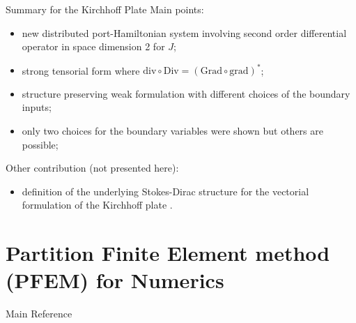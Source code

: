 \documentclass{beamer}
\begin{document}
\begin{frame}{Summary for the Kirchhoff Plate}
Main  points:
\begin{itemize}
	\item new distributed port-Hamiltonian system involving second order differential operator in space dimension 2 for $J$;
	\item strong tensorial form where $\mathrm{div} \circ \mathrm{Div}=(\mathrm{Grad} \circ \mathrm{grad})^*$;
	\item structure preserving weak formulation with different choices of the boundary inputs;
	\item only two choices for the boundary variables were shown but others are possible;
\end{itemize} 
Other contribution (not presented here):
\begin{itemize}
	\item definition of the underlying Stokes-Dirac structure for the vectorial formulation of the Kirchhoff plate \cite{BrugnoliKir}.
\end{itemize}

\end{frame}




\section{Partition Finite Element method (PFEM) for Numerics}

\begin{frame}{Main Reference}
\nobibliography*

\end{frame}
\end{document}
